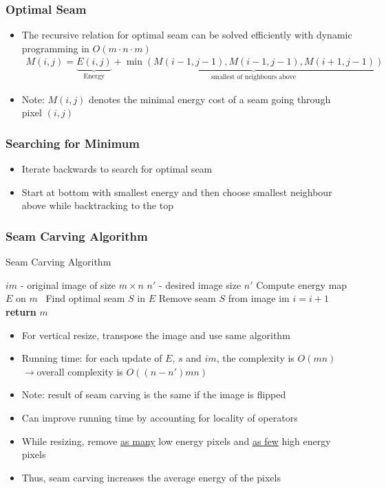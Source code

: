 \documentclass[letterpaper,12pt]{article}
\newcommand{\lra}{\ensuremath{\longrightarrow{}}}
\begin{document}
\subsubsection{Optimal Seam}
\begin{itemize}
 \item The recursive relation for optimal seam can be solved efficiently with dynamic programming in $O(m\cdot n\cdot m)$
       \begin{align}
        M(i,j) = \underbrace{E(i,j)}_\text{Energy} + \underbrace{\min(M(i-1, j-1), M(i-1, j-1), M(i+1, j-1))}_\text{smallest of neighbours above}
       \end{align}
 \item Note: $M(i,j)$ denotes the minimal energy cost of a seam going through pixel $(i,j)$
\end{itemize}

\subsubsection{Searching for Minimum}
\begin{itemize}
 \item Iterate backwards to search for optimal seam
 \item Start at bottom with smallest energy and then choose smallest neighbour above while backtracking to the top
\end{itemize}

\subsubsection{Seam Carving Algorithm}
\begin{algorithm}
 \caption{Seam Carving Algorithm}
 \begin{algorithmic}[1]
   
  \State \quad $im$ - original image of size $m \times n$
  \State \quad $n'$ - desired image size $n'$
  \State Compute energy map $E$ on $m$ \
  \State Find optimal seam $S$ in $E$
  \State Remove seam $S$ from image im
  \State $i = i + 1$
  \EndFor
  \State \textbf{return} $m$
  \EndProcedure
 \end{algorithmic}
\end{algorithm}
\begin{itemize}
 \item For vertical resize, transpose the image and use same algorithm
 \item Running time: for each update of $E$, $s$ and $im$, the complexity is $O(mn)$ \lra overall complexity is $O((n-n')mn)$
 \item Note: result of seam carving is the same if the image is flipped
 \item Can improve running time by accounting for locality of operators
 \item While resizing, remove \underline{as many} low energy pixels and \underline{as few} high energy pixels
 \item Thus, seam carving increases the average energy of the pixels
\end{itemize}
\end{document}
